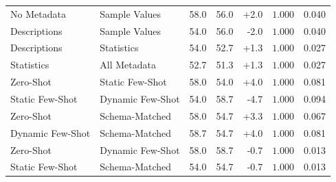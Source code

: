\begin{table}[t]
\begin{tabular}{llrrrrr}
No Metadata & Sample Values & 58.0 & 56.0 & +2.0 & $1.000$ & 0.040 \\
Descriptions & Sample Values & 54.0 & 56.0 & -2.0 & $1.000$ & 0.040 \\
Descriptions & Statistics & 54.0 & 52.7 & +1.3 & $1.000$ & 0.027 \\
Statistics & All Metadata & 52.7 & 51.3 & +1.3 & $1.000$ & 0.027 \\
Zero-Shot & Static Few-Shot & 58.0 & 54.0 & +4.0 & $1.000$ & 0.081 \\
Static Few-Shot & Dynamic Few-Shot & 54.0 & 58.7 & -4.7 & $1.000$ & 0.094 \\
Zero-Shot & Schema-Matched & 58.0 & 54.7 & +3.3 & $1.000$ & 0.067 \\
Dynamic Few-Shot & Schema-Matched & 58.7 & 54.7 & +4.0 & $1.000$ & 0.081 \\
Zero-Shot & Dynamic Few-Shot & 58.0 & 58.7 & -0.7 & $1.000$ & 0.013 \\
Static Few-Shot & Schema-Matched & 54.0 & 54.7 & -0.7 & $1.000$ & 0.013 \\
\bottomrule
\end{tabular}
\end{table}